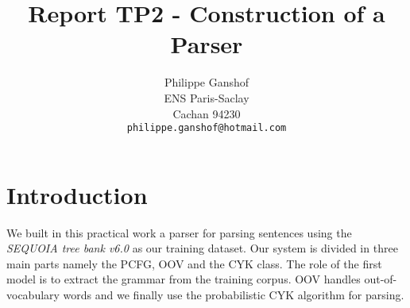 \documentclass[10pt,twocolumn,letterpaper]{article}
\begin{document}
\title{Report TP2 - Construction of a Parser}

\author{Philippe Ganshof\\
ENS Paris-Saclay\\
Cachan 94230 \\
{\tt\small philippe.ganshof@hotmail.com}
}
\maketitle




\section{Introduction}
We built in this practical work a parser for parsing sentences using the \textit{SEQUOIA tree bank v6.0} as our training dataset. Our system is divided in three main parts namely the PCFG, OOV and the CYK class. The role of the first model is to extract the grammar from the training corpus. OOV handles out-of-vocabulary words and we finally use the probabilistic CYK algorithm for parsing. %
\end{document}
